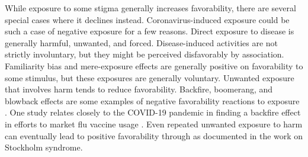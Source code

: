 \documentclass[review]{elsarticle}
\begin{document}


While exposure to some stigma generally increases favorability, there are several special cases where it declines instead.
Coronavirus-induced exposure could be such a case of negative exposure for a few reasons.
Direct exposure to disease is generally harmful, unwanted, and forced.
Disease-induced activities are not strictly involuntary,
but they might be perceived disfavorably by association.
Familiarity bias and mere-exposure effects are generally positive on favorability to some stimulus,
but these exposures are generally voluntary.
Unwanted exposure that involves harm tends to reduce favorability.
Backfire, boomerang, and blowback effects are some examples of negative favorability reactions to exposure
\cite{swire2020searching, byrne2009boomerang, campagna2016strategic}.
One study relates closely to the COVID-19 pandemic in finding a backfire effect in efforts to market flu vaccine usage
\cite{nyhan2015does}.
Even repeated unwanted exposure to harm can eventually lead to positive favorability through as documented in the work on Stockholm syndrome.
\end{document}
